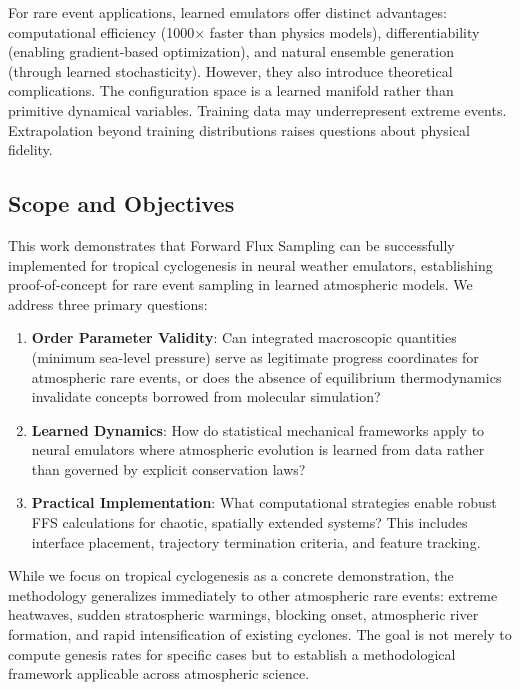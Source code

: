 \documentclass[11pt]{article}
\begin{document}
For rare event applications, learned emulators offer distinct advantages: computational efficiency (1000$\times$ faster than physics models), differentiability (enabling gradient-based optimization), and natural ensemble generation (through learned stochasticity). However, they also introduce theoretical complications. The configuration space is a learned manifold rather than primitive dynamical variables. Training data may underrepresent extreme events. Extrapolation beyond training distributions raises questions about physical fidelity.

\subsection{Scope and Objectives}

This work demonstrates that Forward Flux Sampling can be successfully implemented for tropical cyclogenesis in neural weather emulators, establishing proof-of-concept for rare event sampling in learned atmospheric models. We address three primary questions:

\begin{enumerate}
    \item \textbf{Order Parameter Validity}: Can integrated macroscopic quantities (minimum sea-level pressure) serve as legitimate progress coordinates for atmospheric rare events, or does the absence of equilibrium thermodynamics invalidate concepts borrowed from molecular simulation?
    
    \item \textbf{Learned Dynamics}: How do statistical mechanical frameworks apply to neural emulators where atmospheric evolution is learned from data rather than governed by explicit conservation laws?
    
    \item \textbf{Practical Implementation}: What computational strategies enable robust FFS calculations for chaotic, spatially extended systems? This includes interface placement, trajectory termination criteria, and feature tracking.
\end{enumerate}

While we focus on tropical cyclogenesis as a concrete demonstration, the methodology generalizes immediately to other atmospheric rare events: extreme heatwaves, sudden stratospheric warmings, blocking onset, atmospheric river formation, and rapid intensification of existing cyclones. The goal is not merely to compute genesis rates for specific cases but to establish a methodological framework applicable across atmospheric science.
\end{document}
